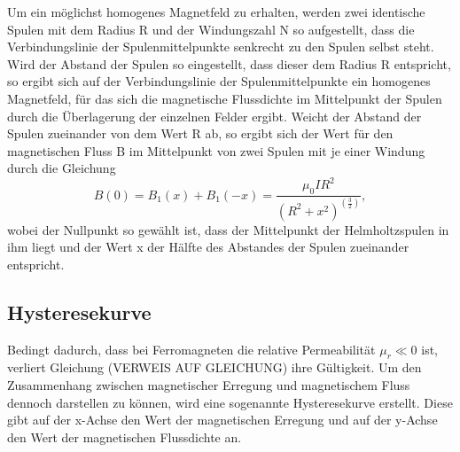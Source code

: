Um ein möglichst homogenes Magnetfeld zu erhalten, werden zwei identische Spulen mit dem Radius R und der Windungszahl N 
so aufgestellt, dass die Verbindungslinie der Spulenmittelpunkte senkrecht zu den Spulen selbst steht. Wird der Abstand 
der Spulen so eingestellt, dass dieser dem Radius R entspricht, so ergibt sich auf der Verbindungslinie der 
Spulenmittelpunkte ein homogenes Magnetfeld, für das sich die magnetische Flussdichte im Mittelpunkt der Spulen durch
die Überlagerung der einzelnen Felder ergibt. 
Weicht der Abstand der Spulen zueinander von dem Wert R ab, so ergibt sich der Wert für den magnetischen Fluss B im 
Mittelpunkt von zwei Spulen mit je einer Windung durch die Gleichung
\begin{equation}
    B(0) = B_1(x) + B_1(-x) = \frac{\mu_0 I R^2}{(R^2 + x^2)^(\frac{3}{2})},
\end{equation}
\noindent
wobei der Nullpunkt so gewählt ist, dass der Mittelpunkt der Helmholtzspulen in ihm liegt und der Wert x 
der Hälfte des Abstandes der Spulen zueinander entspricht.




\subsection{Hysteresekurve}

\noindent
Bedingt dadurch, dass bei Ferromagneten die relative Permeabilität $\mu_r \ll 0$ ist, verliert Gleichung (VERWEIS AUF GLEICHUNG)
ihre Gültigkeit. Um den Zusammenhang zwischen magnetischer Erregung und magnetischem Fluss dennoch darstellen zu können, wird
eine sogenannte Hysteresekurve erstellt. Diese gibt auf der x-Achse den Wert der magnetischen Erregung und auf der y-Achse
den Wert der magnetischen Flussdichte an. \\

